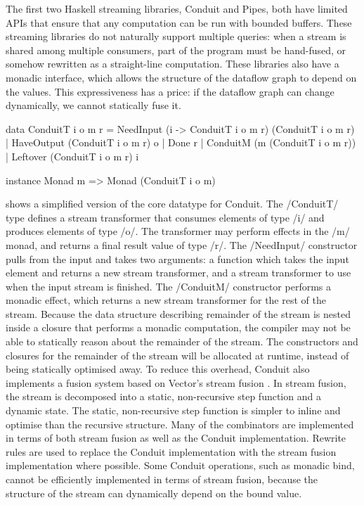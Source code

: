 The first two Haskell streaming libraries, Conduit and Pipes, both have limited APIs that ensure that any computation can be run with bounded buffers.
These streaming libraries do not naturally support multiple queries: when a stream is shared among multiple consumers, part of the program must be hand-fused, or somehow rewritten as a straight-line computation.
These libraries also have a monadic interface, which allows the structure of the dataflow graph to depend on the values.
This expressiveness has a price: if the dataflow graph can change dynamically, we cannot statically fuse it.

\begin{haskell}[float,caption=Conduit datatypes,label=l:bench:def:conduit]
data ConduitT i o m r =
    NeedInput  (i -> ConduitT i o m r) (ConduitT i o m r)
  | HaveOutput (ConduitT i o m r) o
  | Done r
  | ConduitM   (m (ConduitT i o m r))
  | Leftover   (ConduitT i o m r) i

instance Monad m => Monad (ConduitT i o m)
\end{haskell}

 shows a simplified version of the core datatype for Conduit.
The \Hs/ConduitT/ type defines a stream transformer that consumes elements of type \Hs/i/ and produces elements of type \Hs/o/.
The transformer may perform effects in the \Hs/m/ monad, and returns a final result value of type \Hs/r/.
The \Hs/NeedInput/ constructor pulls from the input and takes two arguments: a function which takes the input element and returns a new stream transformer, and a stream transformer to use when the input stream is finished.
The \Hs/ConduitM/ constructor performs a monadic effect, which returns a new stream transformer for the rest of the stream.
Because the data structure describing remainder of the stream is nested inside a closure that performs a monadic computation, the compiler may not be able to statically reason about the remainder of the stream.
The constructors and closures for the remainder of the stream will be allocated at runtime, instead of being statically optimised away.
To reduce this overhead, Conduit also implements a fusion system based on Vector's stream fusion \citep{coutts2007stream}.
In stream fusion, the stream is decomposed into a static, non-recursive step function and a dynamic state.
The static, non-recursive step function is simpler to inline and optimise than the recursive structure.
Many of the combinators are implemented in terms of both stream fusion as well as the Conduit implementation.
Rewrite rules are used to replace the Conduit implementation with the stream fusion implementation where possible.
Some Conduit operations, such as monadic bind, cannot be efficiently implemented in terms of stream fusion, because the structure of the stream can dynamically depend on the bound value.

